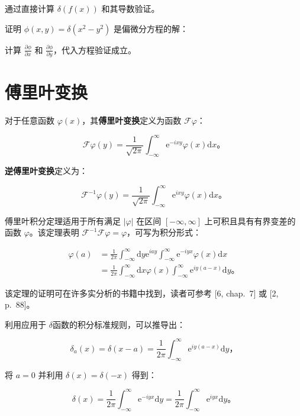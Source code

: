 通过直接计算 $\delta(f(x))$ 和其导数验证。

证明 $\phi(x, y) = \delta(x^2 - y^2)$ 是偏微分方程的解：

计算 $\frac{\partial \phi}{\partial x}$ 和
$\frac{\partial \phi}{\partial y}$，代入方程验证成立。

\section{傅里叶变换}\label{12.3}

对于任意函数 $\varphi(x)$，其\textbf{傅里叶变换}定义为函数
$\mathcal{F} \varphi$：

$$
\mathcal{F} \varphi(y)=\frac{1}{\sqrt{2 \pi}} \int_{-\infty}^\infty \mathrm{e}^{-i x y} \varphi(x) \mathrm{d}x。
$$

\textbf{逆傅里叶变换}定义为：

$$
\mathcal{F}^{-1} \varphi(y)=\frac{1}{\sqrt{2 \pi}} \int_{-\infty}^\infty \mathrm{e}^{i x y} \varphi(x) \mathrm{d}x。
$$

傅里叶积分定理适用于所有满足 $|\varphi|$ 在区间 $[-\infty, \infty]$
上可积且具有有界变差的函数 $\varphi$。该定理表明
$\mathcal{F}^{-1} \mathcal{F} \varphi=\varphi$，可写为积分形式：

$$
\begin{aligned}
\varphi(a) & =\frac{1}{2 \pi} \int_{-\infty}^\infty \mathrm{d}y \mathrm{e}^{i a y} \int_{-\infty}^\infty \mathrm{e}^{-i y x} \varphi(x) \mathrm{d}x \\
& =\frac{1}{2 \pi} \int_{-\infty}^\infty \mathrm{d}x \varphi(x) \int_{-\infty}^\infty \mathrm{e}^{i y(a-x)} \mathrm{d}y。
\end{aligned}
$$

该定理的证明可在许多实分析的书籍中找到，读者可参考 {[}6, chap.~7{]} 或
{[}2, p.~88{]}。

利用应用于 $\delta$函数的积分标准规则，可以推导出：

\begin{equation}\label{eq:12.10} 
 \delta_a(x) = \delta(x-a) = \frac{1}{2 \pi} \int_{-\infty}^\infty \mathrm{e}^{i y(a-x)} \mathrm{d}y， 
 \end{equation}

将 $a=0$ 并利用 $\delta(x)=\delta(-x)$ 得到：

\begin{equation}\label{eq:12.11} 
 \delta(x)=\frac{1}{2 \pi} \int_{-\infty}^\infty \mathrm{e}^{-i y x} \mathrm{d}y = \frac{1}{2 \pi} \int_{-\infty}^\infty \mathrm{e}^{i y x} \mathrm{d}y。 
 \end{equation}

